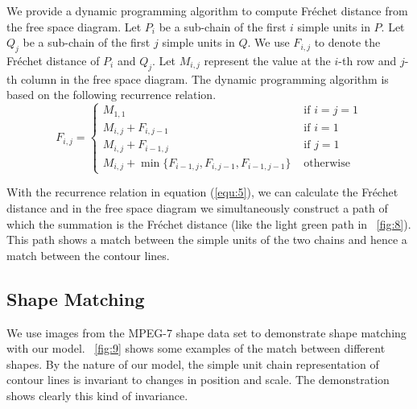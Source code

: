 \documentclass[10pt,letterpaper]{article}
\begin{document}
We provide a dynamic programming algorithm to compute Fr\'echet distance from the free space diagram.
Let $P_i$ be a sub-chain of the first $i$ simple units in $P$.
Let $Q_j$ be a sub-chain of the first $j$ simple units in $Q$.
We use $F_{i,j}$ to denote the Fr\'echet distance of $P_i$ and $Q_j$.
Let $M_{i,j}$ represent the value at the $i$-th row and $j$-th column in the free space diagram. 
The dynamic programming algorithm is based on the following recurrence relation.
\begin{equation}\label{equ:5}
F_{i,j}=
\left\{\begin{array}{ll}
M_{1,1} & \mbox{ if $i=j=1$}\\
M_{i,j} + F_{i,j-1} & \mbox{ if $i=1$}\\
M_{i,j} + F_{i-1,j} & \mbox{ if $j=1$}\\
M_{i,j} + \min\{F_{i-1,j},F_{i,j-1},F_{i-1,j-1}\} & \mbox{ otherwise}
\end{array}\right.
\end{equation}

With the recurrence relation in equation (\ref{equ:5}),
we can calculate the Fr\'echet distance and in the free space diagram we simultaneously construct a path
of which the summation is the Fr\'echet distance (like the light green path in \figurename~\ref{fig:8}).
This path shows a match between the simple units of the two chains
and hence a match between the contour lines.

\subsection{Shape Matching}

We use images from the MPEG-7 shape data set to demonstrate shape matching with our model.
\figurename~\ref{fig:9} shows some examples of the match between different shapes.
By the nature of our model,
the simple unit chain representation of contour lines is invariant to changes in position and scale.
The demonstration shows clearly this kind of invariance.
\end{document}
